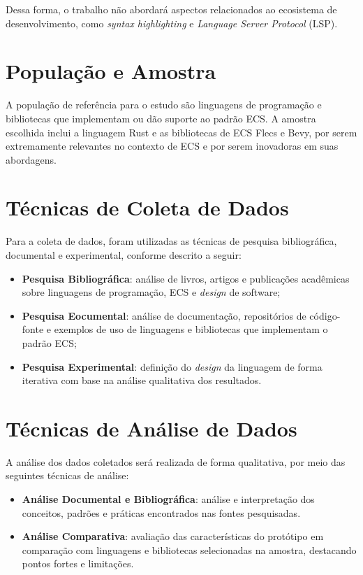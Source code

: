 Dessa forma, o trabalho não abordará aspectos relacionados ao ecosistema de desenvolvimento, como \textit{syntax highlighting} e \textit{Language Server Protocol} (LSP).

\section{População e Amostra}

A população de referência para o estudo são linguagens de programação e bibliotecas que implementam ou dão suporte ao padrão ECS. A amostra escolhida inclui a linguagem Rust e as bibliotecas de ECS Flecs e Bevy, por serem extremamente relevantes no contexto de ECS e por serem inovadoras em suas abordagens.

\section{Técnicas de Coleta de Dados}

Para a coleta de dados, foram utilizadas as técnicas de pesquisa bibliográfica, documental e experimental, conforme descrito a seguir:

\begin{itemize}
    \item \textbf{Pesquisa Bibliográfica}: análise de livros, artigos e publicações acadêmicas sobre linguagens de programação, ECS e \textit{design} de software;
    \item \textbf{Pesquisa Eocumental}: análise de documentação, repositórios de código-fonte e exemplos de uso de linguagens e bibliotecas que implementam o padrão ECS;
    \item \textbf{Pesquisa Experimental}: definição do \textit{design} da linguagem de forma iterativa com base na análise qualitativa dos resultados.
\end{itemize}

\section{Técnicas de Análise de Dados}

A análise dos dados coletados será realizada de forma qualitativa, por meio das seguintes técnicas de análise:

\begin{itemize}
    \item \textbf{Análise Documental e Bibliográfica}: análise e interpretação dos conceitos, padrões e práticas encontrados nas fontes pesquisadas.
    \item \textbf{Análise Comparativa}: avaliação das características do protótipo em comparação com linguagens e bibliotecas selecionadas na amostra, destacando pontos fortes e limitações.
\end{itemize}

